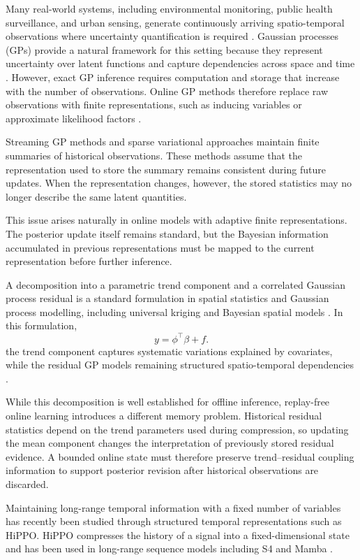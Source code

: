 \documentclass[twoside]{article}
\begin{document}
Many real-world systems, including environmental monitoring, public health surveillance, and urban sensing, generate continuously arriving spatio-temporal observations where uncertainty quantification is required \citep{Hamelijnck2021,Silk2023,Li2018DCRNN}. Gaussian processes (GPs) provide a natural framework for this setting because they represent uncertainty over latent functions and capture dependencies across space and time \citep{Rasmussen2006,Hartikainen2011,Hamelijnck2021}. However, exact GP inference requires computation and storage that increase with the number of observations. Online GP methods therefore replace raw observations with finite representations, such as inducing variables or approximate likelihood factors \citep{Titsias2009,Matthews2016,Csato2002,Bui2017,Maddox2021}.

Streaming GP methods and sparse variational approaches maintain finite summaries of historical observations. These methods assume that the representation used to store the summary remains consistent during future updates. When the representation changes, however, the stored statistics may no longer describe the same latent quantities.

This issue arises naturally in online models with adaptive finite representations. The posterior update itself remains standard, but the Bayesian information accumulated in previous representations must be mapped to the current representation before further inference.

A decomposition into a parametric trend component and a correlated Gaussian process residual is a standard formulation in spatial statistics and Gaussian process modelling, including universal kriging and Bayesian spatial models \citep{Cressie1993,Stein1999,Rasmussen2006}. In this formulation,
\[
y=\phi^\top\beta+f .
\]
the trend component captures systematic variations explained by covariates, while the residual GP models remaining structured spatio-temporal dependencies \citep{Hamelijnck2021}.

While this decomposition is well established for offline inference, replay-free online learning introduces a different memory problem. Historical residual statistics depend on the trend parameters used during compression, so updating the mean component changes the interpretation of previously stored residual evidence. A bounded online state must therefore preserve trend--residual coupling information to support posterior revision after historical observations are discarded.

Maintaining long-range temporal information with a fixed number of variables has recently been studied through structured temporal representations such as HiPPO. HiPPO compresses the history of a signal into a fixed-dimensional state and has been used in long-range sequence models including S4 and Mamba \citep{Gu2020,Gu2022S4,GuDao2023Mamba}.
\end{document}
